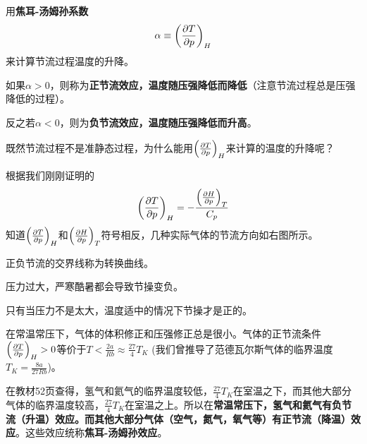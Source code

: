 \documentclass[CJK]{beamer}
\begin{document}
\begin{frame}
\bch

\bitem
\item{用{\bf 焦耳-汤姆孙系数$$\alpha \equiv \left(\frac{\partial T}{\partial p}\right)_{H}$$}来计算节流过程温度的升降。}
\item{如果$\alpha>0$，则称为{\bf 正节流效应，温度随压强降低而降低}（注意节流过程总是压强降低的过程）。}
\item{反之若$\alpha<0$，则为{\bf 负节流效应，温度随压强降低而升高}。}
\eitem

\ech
\end{frame}

\begin{frame}
\bch
{}

既然节流过程不是准静态过程，为什么能用$\left(\frac{\partial T}{\partial p}\right)_{H}$来计算的温度的升降呢？
\ech
\end{frame}

\begin{frame}
\bch

{
\small

根据我们刚刚证明的
$$\left(\frac{\partial T}{\partial p}\right)_{H} = - \frac{\left(\frac{\partial H}{\partial p}\right)_{T}}{C_p}$$
知道$\left(\frac{\partial T}{\partial p}\right)_{H}$和$\left(\frac{\partial H}{\partial p}\right)_{T}$符号相反，几种实际气体的节流方向如右图所示。

\skipline

正负节流的交界线称为转换曲线。

}
\emini
{}
\emini
\ech
\end{frame}

\begin{frame}
\bch
压力过大，严寒酷暑都会导致节操变负。

只有当压力不是太大，温度适中的情况下节操才是正的。


\ech
\end{frame}



\begin{frame}
\bch

在常温常压下，气体的体积修正和压强修正总是很小。气体的正节流条件$\left(\frac{\partial T}{\partial p}\right)_{H}>0$等价于$T<\frac{2a}{Rb} \approx \frac{27}{4} T_K$ (我们曾推导了范德瓦尔斯气体的临界温度$T_K = \frac{8a}{27Rb}$)。

\skipline

在教材52页查得，氢气和氦气的临界温度较低，$\frac{27}{4} T_K$在室温之下，而其他大部分气体的临界温度较高，$\frac{27}{4} T_K$在室温之上。所以在{\bf 常温常压下，氢气和氦气有负节流（升温）效应。而其他大部分气体（空气，氮气，氧气等）有正节流（降温）效应}。这些效应统称{\bf 焦耳-汤姆孙效应}。
\ech
\end{frame}
\end{document}
